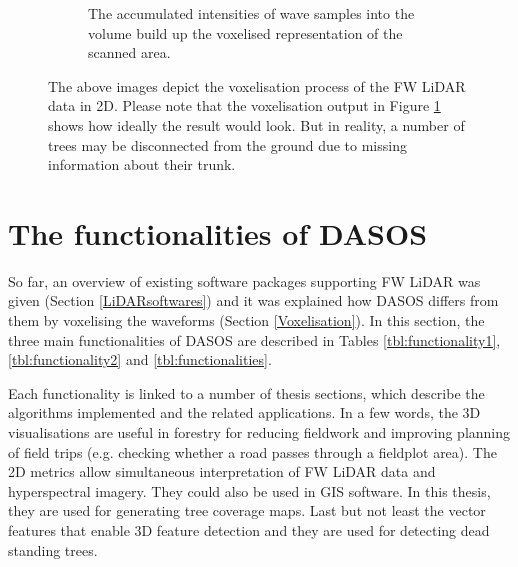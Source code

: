 \documentclass{subfiles}
\begin{document}
{\begin{figure} [h!]
\begin{subfigure}[t]{.31\textwidth}
				\caption{The accumulated intensities of wave samples into the volume build up the voxelised representation of the scanned area.} 
				\label{fig:VoxelisationC_voxelised}
			\end{subfigure}
			\caption[Voxelisation of FW LiDAR data]{The above images depict the voxelisation process of the FW LiDAR data in 2D. Please note that the voxelisation output in Figure \ref{fig:VoxelisationC_voxelised} shows how ideally the result would look. But in reality, a number of trees may be disconnected from the ground due to missing information about their trunk. \footnotemark }  
			\label{fig:Voxelisation} 
		\end{figure}
		
	}
			

	\section{The functionalities of DASOS}\label{DASOS}
	
		\par So far, an overview of existing software packages supporting FW LiDAR was given (Section \ref{LiDARsoftwares}) and it was explained how DASOS differs from them by voxelising the waveforms (Section \ref{Voxelisation}). In this section, the three main functionalities of DASOS are described in Tables \ref{tbl:functionality1}, \ref{tbl:functionality2} and \ref{tbl:functionalities}.
		
	  	\par Each functionality is linked to a number of thesis sections, which describe the algorithms implemented and the related applications. {\color{blue} In a few words, the 3D visualisations are useful in forestry for reducing fieldwork and improving planning of field trips (e.g. checking whether a road passes through a fieldplot area). The 2D metrics allow simultaneous interpretation of FW LiDAR data and hyperspectral imagery. They could also be used in GIS software. In this thesis, they are used for generating tree coverage maps. Last but not least the vector features that enable 3D feature detection and they are used for detecting dead standing trees.}
\end{document}
